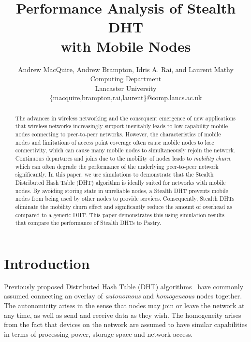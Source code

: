 \documentclass[conference]{IEEEtran}
\begin{document}
\title{Performance Analysis of Stealth DHT\\with Mobile Nodes}
\author{Andrew MacQuire, Andrew Brampton, Idris A. Rai, and Laurent Mathy\\
Computing Department\\
Lancaster University\\
{\{macquire,brampton,rai,laurent\}@comp.lancs.ac.uk}\\
} \maketitle
\begin{abstract}

The advances in wireless networking and the consequent emergence of
new applications that wireless networks increasingly support
inevitably leads to low capability mobile nodes connecting to
peer-to-peer networks.  However, the characteristics of mobile nodes
and limitations of access point coverage often cause mobile nodes to
lose connectivity, which can cause many mobile nodes to
simultaneously rejoin the network. Continuous departures and joins
due to the mobility of nodes leads to {\em mobility churn}, which
can often degrade the performance of the underlying peer-to-peer
network significantly. In this paper, we use simulations to
demonstrate that the Stealth Distributed Hash Table (DHT) algorithm
is ideally suited for networks with mobile nodes. By avoiding
storing state in unreliable nodes, a Stealth DHT prevents mobile
nodes from being used by other nodes to provide services.
Consequently, Stealth DHTs eliminate the mobility churn effect and
significantly reduce the amount of overhead as compared to a generic
DHT. This paper demonstrates this using simulation results that
compare the performance of Stealth DHTs to Pastry.
\end{abstract}

\section{Introduction}
\label{sect-intro}

Previously proposed Distributed Hash Table (DHT)
algorithms~\cite{can01}\cite{pastry01}\cite{chord01}\cite{tapestry01}
have commonly assumed connecting an overlay of {\em autonomous} and
{\em homogeneous} nodes together. The autonomicity arises in the
sense that nodes may join or leave the network at any time, as well
as send and receive data as they wish. The homogeneity arises from
the fact that devices on the network are assumed to have similar
capabilities in terms of processing power, storage space and network
access.
\end{document}
